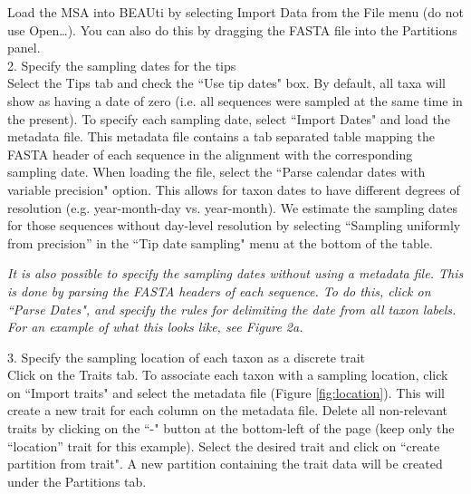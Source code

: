 \documentclass{article}
\newcommand{\ann}[1]{
\begin{adjustwidth}{0.5cm}{}
\it{#1}\\
\end{adjustwidth}}
\begin{document}
Load the MSA into BEAUti by selecting Import Data from the File menu (do not use Open\ldots). You can also do this by dragging the FASTA file into the Partitions panel.\\

2. Specify the sampling dates for the tips\\

Select the Tips tab and check the ``Use tip dates" box. By default, all taxa will show as having a date of zero (i.e. all sequences were sampled at the same time in the present).
To specify each sampling date, select ``Import Dates" and load the metadata file. This metadata file contains a tab separated table mapping the FASTA header of each sequence in the alignment with the corresponding sampling date. When loading the file, select the ``Parse calendar dates with variable precision" option.
This allows for taxon dates to have different degrees of resolution (e.g. year-month-day vs. year-month). We estimate the sampling dates for those sequences without day-level resolution by selecting ``Sampling uniformly from precision'' in the ``Tip date sampling" menu at the bottom of the table. \\ %

\ann{It is also possible to specify the sampling dates without using a metadata file. This is done by parsing the FASTA headers of each sequence. To do this, click on ``Parse Dates", and specify the rules for delimiting the date from all taxon labels. For an example of what this looks like, see \cite{skyprot} Figure 2a.}

3. Specify the sampling location of each taxon as a discrete trait\\

Click on the Traits tab.
To associate each taxon with a sampling location, click on ``Import traits" and select the metadata file (Figure \ref{fig:location}).
This will create a new trait for each column on the metadata file. Delete all non-relevant traits by clicking on the ``-" button at the bottom-left of the page (keep only the ``location'' trait for this example). Select the desired trait and click on ``create partition from trait". A new partition containing the trait data will be created under the Partitions tab.\\
\end{document}

